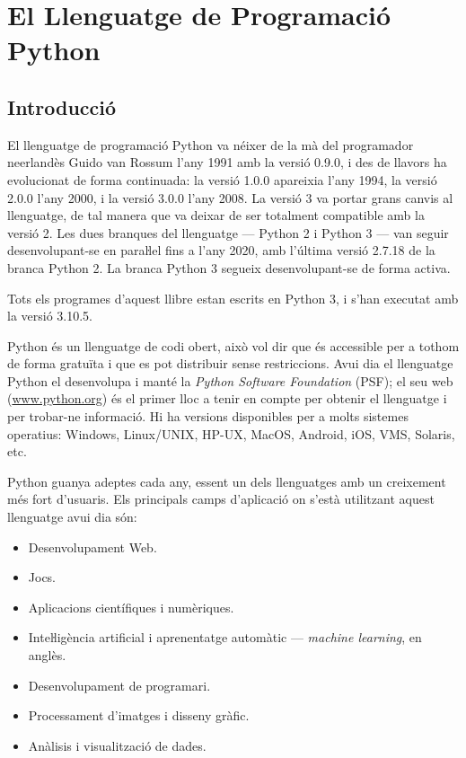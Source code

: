 \chapter{El Llenguatge de Programació Python}\label{chap:python-llenguatge}


\section{Introducció}

El llenguatge de programació Python va néixer de la mà del programador neerlandès Guido van Rossum l'any 1991 amb la versió 0.9.0, i des de llavors  ha evolucionat de forma continuada: la versió 1.0.0 apareixia l'any 1994, la versió 2.0.0 l'any 2000, i la versió 3.0.0 l'any 2008. La versió 3 va portar grans canvis al llenguatge, de tal manera que va deixar de ser totalment compatible amb la versió 2. Les dues branques del llenguatge --- Python 2 i Python 3 --- van seguir desenvolupant-se en paraŀlel fins a l'any 2020, amb l'última versió  2.7.18  de la branca Python 2. La branca Python 3 segueix desenvolupant-se de forma activa.

Tots els programes d'aquest llibre estan escrits en Python 3, i s'han executat amb la versió 3.10.5.

Python és un llenguatge de codi obert, això vol dir que és accessible per a tothom de forma gratuïta i que es pot distribuir sense restriccions.  Avui  dia el llenguatge Python el desenvolupa i manté la \textit{Python Software Foundation} (PSF); el seu web (\href{https://www.python.org/}{www.python.org}) és el primer lloc a tenir en compte per obtenir el llenguatge i per trobar-ne informació. Hi ha versions disponibles per a molts sistemes operatius: Windows, Linux/UNIX, HP-UX, MacOS, Android, iOS, VMS, Solaris, etc.

Python guanya adeptes cada any, essent un dels llenguatges amb un creixement més fort d'usuaris. Els principals camps d'aplicació on s'està utilitzant aquest llenguatge avui dia són:
\begin{itemize}
	\item Desenvolupament Web.
	\item Jocs.
	\item Aplicacions científiques i numèriques.
	\item Inteŀligència artificial i aprenentatge automàtic --- \textit{machine learning}, en anglès.
	\item Desenvolupament de programari.
	\item Processament d'imatges i disseny gràfic.
	\item Anàlisis i visualització de dades.
\end{itemize}

